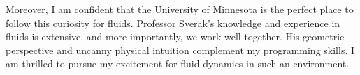 \documentclass[12pt]{article}
\begin{document}
Moreover, I am confident that the University of Minnesota is the perfect place to follow this curiosity for fluids. Professor Sverak's knowledge and experience in fluids is extensive, and more importantly,  we work well together. His geometric perspective and uncanny physical intuition complement my programming skills. I am thrilled to pursue my excitement for fluid dynamics in such an environment.
\end{document}
